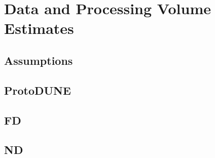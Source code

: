 \chapter{Data and Processing Volume Estimates}
\label{ch:est}

\section{Assumptions}
\label{sec:est:assume}  %

\section{ProtoDUNE}
\label{sec:est:FD}  

\section{FD}
\label{sec:est:FD}  

\section{ND}
\label{sec:est:ND}  
